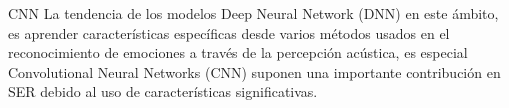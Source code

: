 \documentclass[11pt,a4paper,spanish]{book}
\begin{document}
	CNN
	La tendencia de los modelos Deep Neural Network (DNN) en este ámbito, es aprender características específicas desde varios métodos usados en el reconocimiento de emociones a través de la percepción acústica, es especial Convolutional Neural Networks (CNN) suponen una importante contribución en SER debido al uso de características significativas.
	
	
	\printbibliography
	
\end{document}
